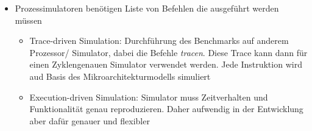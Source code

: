 \begin{itemize}
\begin{itemize}
\begin{itemize}
		\end{itemize}
		\item Prozessimulatoren benötigen Liste von Befehlen die ausgeführt werden müssen
		\begin{itemize}
			\item Trace-driven Simulation: Durchführung des Benchmarks auf anderem Prozessor/ Simulator, dabei die Befehle \emph{tracen}. Diese Trace kann dann für einen Zyklengenauen Simulator verwendet werden. Jede Instruktion wird aud Basis des Mikroarchitekturmodells simuliert
			\item Execution-driven Simulation: Simulator muss Zeitverhalten und Funktionalität genau reproduzieren. Daher aufwendig in der Entwicklung aber dafür genauer und flexibler
		\end{itemize} 
	\end{itemize}
\end{itemize}


